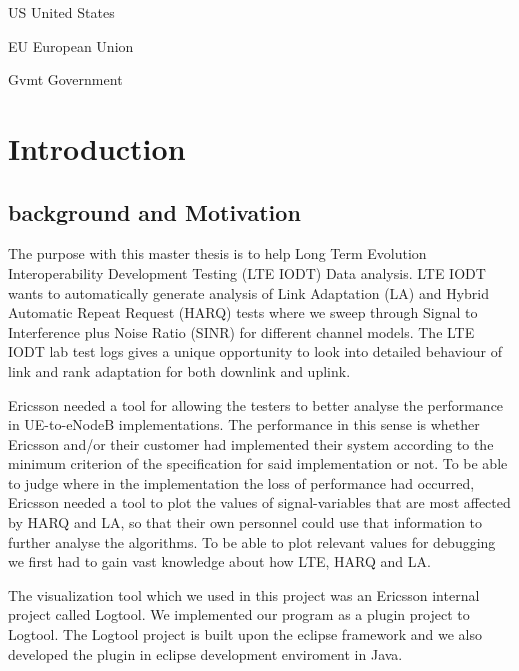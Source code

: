 \documentclass[cropmarks, frame, english]{idamasterthesis}
\author{Paul Nedstrand \& Razmus Lindgren}
\newcommand{\abbrlabel}[1]{\makebox[3cm][l]{\textbf{#1}\ \dotfill}}
\newenvironment{abbreviations}{\begin{list}{}{\renewcommand{\makelabel}{\abbrlabel}}}{\end{list}}
\begin{document}
\begin{abbreviations}
\item[US] United States
\item[EU] European Union
\item[Gvmt] Government
\end{abbreviations}


\makeintropages


\chapter{Introduction}

\section{background and Motivation}
The purpose with this master thesis is to help Long Term Evolution Interoperability Development Testing (LTE IODT) Data analysis. LTE IODT wants to automatically generate analysis of Link Adaptation (LA) and Hybrid Automatic Repeat Request (HARQ) tests where we sweep through Signal to Interference plus Noise Ratio (SINR) for different channel models. The LTE IODT lab test logs gives a unique opportunity to look into detailed behaviour of link and rank adaptation for both downlink and uplink. \newline


Ericsson needed a tool for allowing the testers to better analyse the performance in UE-to-eNodeB implementations. The performance in this sense is whether Ericsson and/or their customer had implemented their system according to the minimum criterion of the specification for said implementation or not. To be able to judge where in the implementation the loss of performance had occurred, Ericsson needed a tool to plot the values of signal-variables that are most affected by HARQ and LA, so that their own personnel could use that information to further analyse the algorithms. To be able to plot relevant values for debugging we first had to gain vast knowledge about how LTE, HARQ and LA. \newline


The visualization tool which we used in this project was an Ericsson internal project called Logtool. We implemented our program as a plugin project to Logtool. The Logtool project is built upon the eclipse framework and we also developed the plugin in eclipse development enviroment in Java. 
\end{document}
